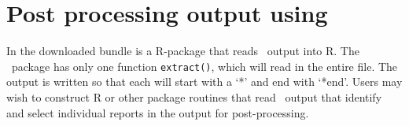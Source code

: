 \section{Post processing output using \R \label{sec:post-processing}}

In the downloaded bundle is a R-package that reads \CNAME\ output into R. The \CNAME\ package has only one function \texttt{extract()}, which will read in the entire file. The output is written so that each  will start with a `*' and end with `*end'. Users may wish to construct R or other package routines that read \CNAME\ output that  identify and select individual reports in the output for post-processing.
